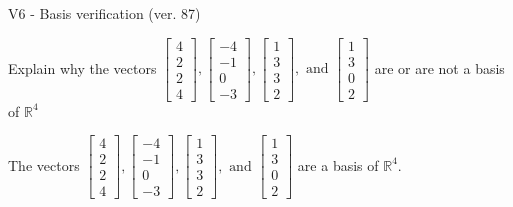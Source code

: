 \begin{exercise}
  \begin{exerciseTitle}V6 - Basis verification (ver. 87)\end{exerciseTitle}
  \begin{exerciseStatement}
    Explain why the vectors \(\left[\begin{array}{r}
4 \\
2 \\
2 \\
4
\end{array}\right] , \left[\begin{array}{r}
-4 \\
-1 \\
0 \\
-3
\end{array}\right] , \left[\begin{array}{r}
1 \\
3 \\
3 \\
2
\end{array}\right] , \text{ and } \left[\begin{array}{r}
1 \\
3 \\
0 \\
2
\end{array}\right]\) are or are not a basis of \(\mathbb{R}^4\)	


  \end{exerciseStatement}
  \begin{exerciseAnswer}
   The vectors \(\left[\begin{array}{r}
4 \\
2 \\
2 \\
4
\end{array}\right] , \left[\begin{array}{r}
-4 \\
-1 \\
0 \\
-3
\end{array}\right] , \left[\begin{array}{r}
1 \\
3 \\
3 \\
2
\end{array}\right] , \text{ and } \left[\begin{array}{r}
1 \\
3 \\
0 \\
2
\end{array}\right]\) 
  	 are  a basis of \(\mathbb{R}^4\).
  


  \end{exerciseAnswer}
\end{exercise}